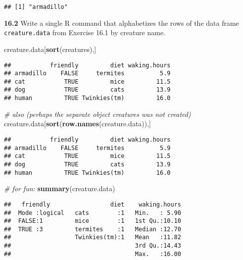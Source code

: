 \documentclass[]{article}
\newenvironment{Shaded}{\begin{snugshade}}{\end{snugshade}}
\newcommand{\KeywordTok}[1]{\textcolor[rgb]{0.13,0.29,0.53}{\textbf{#1}}}
\newcommand{\CommentTok}[1]{\textcolor[rgb]{0.56,0.35,0.01}{\textit{#1}}}
\newcommand{\NormalTok}[1]{#1}
\begin{document}
\begin{verbatim}
## [1] "armadillo"
\end{verbatim}

\textbf{16.2} Write a single R command that alphabetizes the rows of the
data frame \texttt{creature.data} from Exercise 16.1 by creature name.

\begin{Shaded}
\begin{Highlighting}[]
\NormalTok{creature.data[}\KeywordTok{sort}\NormalTok{(creatures),]}
\end{Highlighting}
\end{Shaded}

\begin{verbatim}
##           friendly         diet waking.hours
## armadillo    FALSE     termites          5.9
## cat           TRUE         mice         11.5
## dog           TRUE         cats         13.9
## human         TRUE Twinkies(tm)         16.0
\end{verbatim}

\begin{Shaded}
\begin{Highlighting}[]
\CommentTok{# also (perhaps the separate object creatures was not created)}
\NormalTok{ creature.data[}\KeywordTok{sort}\NormalTok{(}\KeywordTok{row.names}\NormalTok{(creature.data)),]}
\end{Highlighting}
\end{Shaded}

\begin{verbatim}
##           friendly         diet waking.hours
## armadillo    FALSE     termites          5.9
## cat           TRUE         mice         11.5
## dog           TRUE         cats         13.9
## human         TRUE Twinkies(tm)         16.0
\end{verbatim}

\begin{Shaded}
\begin{Highlighting}[]
\CommentTok{# for fun:}
\KeywordTok{summary}\NormalTok{(creature.data)}
\end{Highlighting}
\end{Shaded}

\begin{verbatim}
##   friendly                 diet    waking.hours  
##  Mode :logical   cats        :1   Min.   : 5.90  
##  FALSE:1         mice        :1   1st Qu.:10.10  
##  TRUE :3         termites    :1   Median :12.70  
##                  Twinkies(tm):1   Mean   :11.82  
##                                   3rd Qu.:14.43  
##                                   Max.   :16.00
\end{verbatim}
\end{document}

